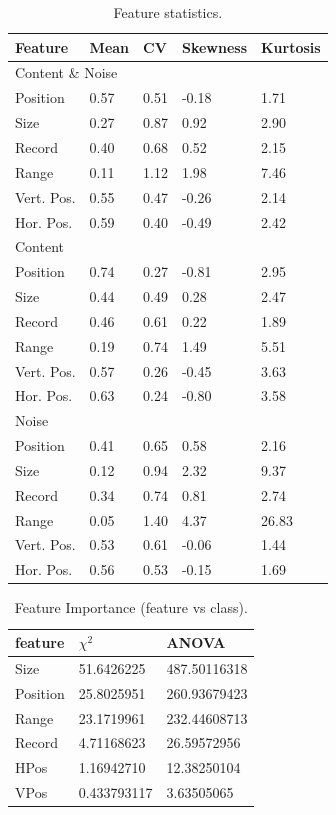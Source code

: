 \begin{table}[h]
\centering
\caption{Feature statistics.}
\label{tab:stat}
\begin{tabular}{ | l | l | l | l | l |}
\hline
Feature & Mean & CV & Skewness & Kurtosis \\
\hline
\multicolumn{5}{|l|}{Content \& Noise} \\
\hline
Position & 0.57 & 0.51 & -0.18 & 1.71 \\
Size & 0.27 & 0.87 & 0.92 & 2.90 \\
Record & 0.40 & 0.68 & 0.52 & 2.15 \\
Range & 0.11 & 1.12 & 1.98 & 7.46 \\
Vert. Pos. & 0.55 & 0.47 & -0.26 & 2.14 \\
Hor. Pos. & 0.59 & 0.40 & -0.49 & 2.42 \\
\hline
\multicolumn{5}{|l|}{Content} \\
\hline
Position & 0.74 & 0.27 & -0.81 & 2.95 \\
Size & 0.44 & 0.49 & 0.28 & 2.47 \\
Record & 0.46 & 0.61 & 0.22 & 1.89 \\
Range & 0.19 & 0.74 & 1.49 & 5.51 \\
Vert. Pos. & 0.57 & 0.26 & -0.45 & 3.63 \\
Hor. Pos. & 0.63 & 0.24 & -0.80 & 3.58 \\
\hline
\multicolumn{5}{|l|}{Noise} \\
\hline
Position & 0.41 & 0.65 & 0.58 & 2.16 \\
Size & 0.12 & 0.94 & 2.32 & 9.37 \\
Record & 0.34 & 0.74 & 0.81 & 2.74 \\
Range & 0.05 & 1.40 & 4.37 & 26.83 \\
Vert. Pos. & 0.53 & 0.61 & -0.06 & 1.44 \\
Hor. Pos. & 0.56 & 0.53 & -0.15 & 1.69 \\
\hline
\end{tabular}
\end{table}

\begin{table}[h]
\centering
\caption{Feature Importance (feature vs class).}
\label{tab:importance}
\begin{tabular}{| l | l | l |}
\hline
feature & $\chi^2$ & ANOVA \\
\hline
Size     & 51.6426225  & 487.50116318 \\
Position & 25.8025951  & 260.93679423 \\
Range    & 23.1719961  & 232.44608713 \\
Record   & 4.71168623  & 26.59572956 \\
HPos     & 1.16942710  & 12.38250104 \\
VPos     & 0.433793117 & 3.63505065 \\
\hline
\end{tabular}
\end{table}
         
